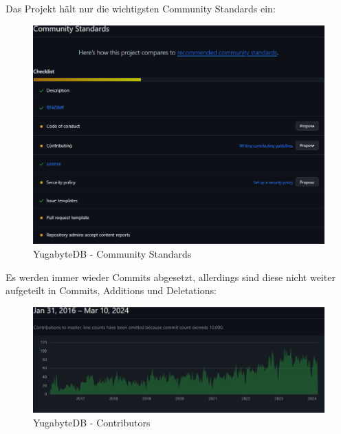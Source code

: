 \begin{flushleft}
    Das Projekt hält nur die wichtigsten Community Standards ein:
    \begin{figure}[H]
        \centering
        \includegraphics[width=0.75\linewidth]{source/implementation/evaluation/postgresql_ha_solutions/insights/yugabytedb/community Standards}
        \caption{YugabyteDB - Community Standards}
        \label{fig:community Standards_yugabyte-db}
    \end{figure}

    Es werden immer wieder Commits abgesetzt, allerdings sind diese nicht weiter aufgeteilt in Commits, Additions und Deletations:
    \begin{figure}[H]
        \centering
        \includegraphics[width=0.75\linewidth]{source/implementation/evaluation/postgresql_ha_solutions/insights/yugabytedb/contributors_to_yugabyte_yugabyte-db}
        \caption{YugabyteDB - Contributors}
        \label{fig:contributors_to_yugabyte_yugabyte-db}
    \end{figure}


\end{flushleft}
